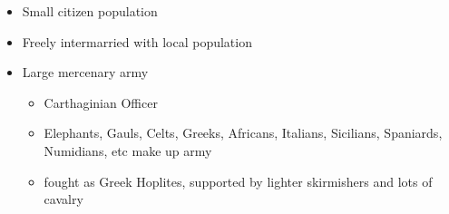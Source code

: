 \documentclass[12pt, twoside]{article}
\begin{document}
\begin{itemize}
\begin{itemize}
	\item Small citizen population

	\item Freely intermarried with local population

	\item Large mercenary army
		\begin{itemize}
		\item Carthaginian Officer
		\item Elephants, Gauls, Celts, Greeks, Africans, Italians, Sicilians, Spaniards, Numidians, etc make up army
		\item fought as Greek Hoplites, supported by lighter skirmishers and lots of cavalry
		\end{itemize}
	\end{itemize}
\end{itemize}
\end{document}
